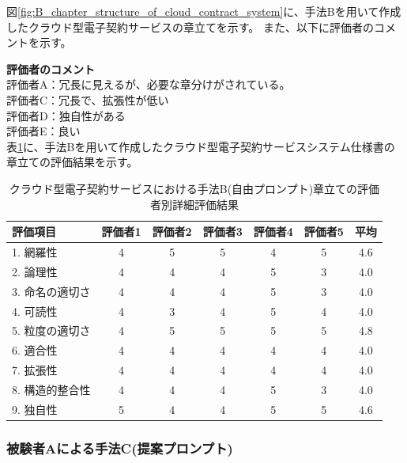 図\ref{fig:B_chapter_structure_of_cloud_contract_system}に、手法Bを用いて作成したクラウド型電子契約サービスの章立てを示す。
また、以下に評価者のコメントを示す。

\noindent\textbf{評価者のコメント}\\
評価者A：冗長に見えるが、必要な章分けがされている。\\
評価者C：冗長で、拡張性が低い\\
評価者D：独自性がある\\
評価者E：良い\\

表\ref{tb:cloud_detailed_evaluation_results_B}に、手法Bを用いて作成したクラウド型電子契約サービスシステム仕様書の章立ての評価結果を示す。

\begin{table}[tp]
  \caption{クラウド型電子契約サービスにおける手法B(自由プロンプト)章立ての評価者別詳細評価結果}
  \label{tb:cloud_detailed_evaluation_results_B}
  \centering
  \begin{tabular}{|l|c|c|c|c|c|c|}
    \hline
    \textbf{評価項目} & \textbf{評価者1} & \textbf{評価者2} & \textbf{評価者3} & \textbf{評価者4} & \textbf{評価者5} & \textbf{平均} \\
    \hline\hline
    1. 網羅性 & 4 & 5 & 5 & 4 & 5 & 4.6 \\
    \hline
    2. 論理性 & 4 & 4 & 4 & 5 & 3 & 4.0 \\
    \hline
    3. 命名の適切さ & 4 & 4 & 4 & 5 & 3 & 4.0 \\
    \hline
    4. 可読性 & 4 & 3 & 4 & 5 & 4 & 4.0 \\
    \hline
    5. 粒度の適切さ & 4 & 5 & 5 & 5 & 5 & 4.8 \\
    \hline
    6. 適合性 & 4 & 4 & 4 & 4 & 4 & 4.0 \\
    \hline
    7. 拡張性 & 4 & 4 & 4 & 4 & 4 & 4.0 \\
    \hline
    8. 構造的整合性 & 4 & 4 & 4 & 5 & 3 & 4.0 \\
    \hline
    9. 独自性 & 5 & 4 & 4 & 5 & 5 & 4.6 \\
    \hline
  \end{tabular}
\end{table}





\subsubsection{被験者Aによる手法C(提案プロンプト)}

